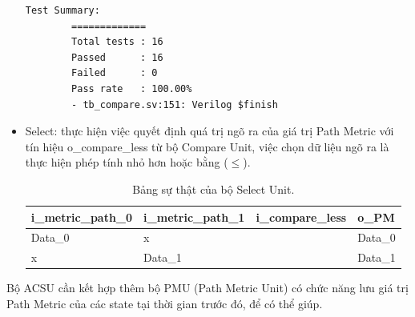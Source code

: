 \begin{itemize}[label=-]
\begin{lstlisting}[style=StyleResult, language=Result, caption={The Result of testing Compare Unit.}]
		Test Summary:
		=============
		Total tests : 16
		Passed      : 16
		Failed      : 0
		Pass rate   : 100.00%
		- tb_compare.sv:151: Verilog $finish
	\end{lstlisting}
	
	\item Select: thực hiện việc quyết định quá trị ngõ ra của giá trị Path Metric với tín hiệu o\_compare\_less từ bộ Compare Unit, việc chọn dữ liệu ngõ ra là thực hiện phép tính nhỏ hơn hoặc bằng ($\leq$).
	
	\begin{table}[H]
		\centering
		\begin{tabular}{|>{\centering\arraybackslash}p{4cm}|>{\centering\arraybackslash}p{4cm}|>{\centering\arraybackslash}p{4cm}|>{\centering\arraybackslash}p{4cm}|}
			\hline
			\textbf{i\_metric\_path\_0} & \textbf{i\_metric\_path\_1} & \textbf{i\_compare\_less} & \textbf{o\_PM}\\
			\hline
			Data\_0 & x & 0 & Data\_0 \\
			\hline
			x & Data\_1 & 1 & Data\_1 \\
			\hline
		\end{tabular}
		\caption{Bảng sự thật của bộ Select Unit.}
	\end{table}
	 
\end{itemize}

Bộ ACSU cần kết hợp thêm bộ PMU (Path Metric Unit) có chức năng lưu giá trị Path Metric của các state tại thời gian trước đó, để có thể giúp.

